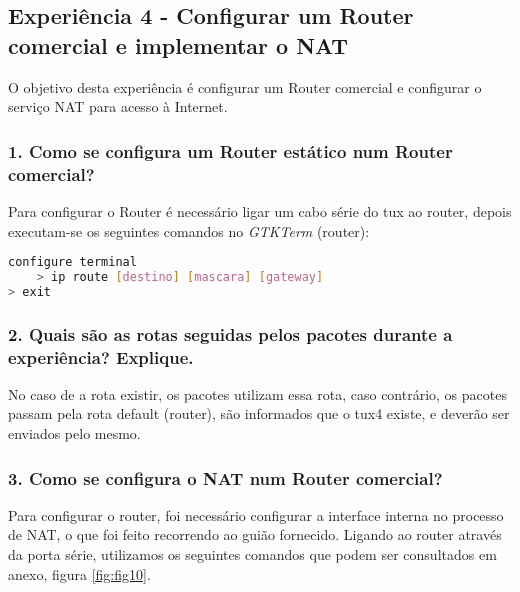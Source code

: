 \subsection*{Experiência 4 - Configurar um Router comercial e implementar o NAT}
O objetivo desta experiência é configurar um Router comercial e configurar o serviço NAT para acesso à Internet.

\subsubsection{1. Como se configura um Router estático num Router comercial?}
Para configurar o Router é necessário ligar um cabo série do tux ao router, depois executam-se os seguintes comandos no \emph{GTKTerm} (router):

\begin{lstlisting}[language=bash]
	configure terminal
	> ip route [destino] [mascara] [gateway]
> exit
\end{lstlisting}

\subsubsection{2. Quais são as rotas seguidas pelos pacotes durante a experiência? Explique.}
No caso de a rota existir, os pacotes utilizam essa rota, caso contrário, os pacotes passam pela rota default (router), são informados que o tux4 existe, e deverão ser enviados pelo mesmo.

\subsubsection{3. Como se configura o NAT num Router comercial?}
Para configurar o router, foi necessário configurar a interface interna no processo de NAT, o que foi feito recorrendo ao guião fornecido. Ligando ao router através da porta série, utilizamos os seguintes comandos que podem ser consultados em anexo, figura \ref{fig:fig10}.

